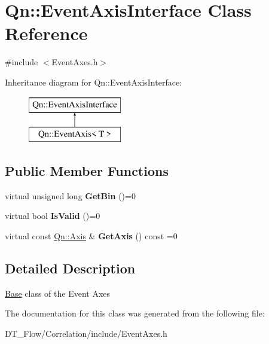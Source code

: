 \hypertarget{classQn_1_1EventAxisInterface}{}\section{Qn\+:\+:Event\+Axis\+Interface Class Reference}
\label{classQn_1_1EventAxisInterface}


{\ttfamily \#include $<$Event\+Axes.\+h$>$}

Inheritance diagram for Qn\+:\+:Event\+Axis\+Interface\+:\begin{figure}[H]
\begin{center}
\leavevmode
\includegraphics[height=2.000000cm]{classQn_1_1EventAxisInterface}
\end{center}
\end{figure}
\subsection*{Public Member Functions}
\begin{DoxyCompactItemize}
\item 
\mbox{\label{classQn_1_1EventAxisInterface_a3676d7d832b7fcad5907a5015f472589}} 
virtual unsigned long {\bfseries Get\+Bin} ()=0
\item 
\mbox{\label{classQn_1_1EventAxisInterface_ab10571521568059db24ed885ca37d336}} 
virtual bool {\bfseries Is\+Valid} ()=0
\item 
\mbox{\label{classQn_1_1EventAxisInterface_aa0e99311e6deb3b2f072faa284bf244e}} 
virtual const \mbox{\hyperlink{classQn_1_1Axis}{Qn\+::\+Axis}} \& {\bfseries Get\+Axis} () const =0
\end{DoxyCompactItemize}


\subsection{Detailed Description}
\mbox{\hyperlink{classBase}{Base}} class of the Event Axes 

The documentation for this class was generated from the following file\+:\begin{DoxyCompactItemize}
\item 
D\+T\+\_\+\+Flow/\+Correlation/include/Event\+Axes.\+h\end{DoxyCompactItemize}
